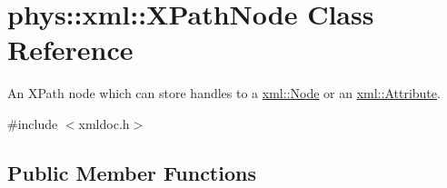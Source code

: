 \hypertarget{classphys_1_1xml_1_1XPathNode}{
\section{phys::xml::XPathNode Class Reference}
\label{df/dd4/classphys_1_1xml_1_1XPathNode}
}


An XPath node which can store handles to a \hyperlink{classphys_1_1xml_1_1Node}{xml::Node} or an \hyperlink{classphys_1_1xml_1_1Attribute}{xml::Attribute}.  




{\ttfamily \#include $<$xmldoc.h$>$}

\subsection*{Public Member Functions}
